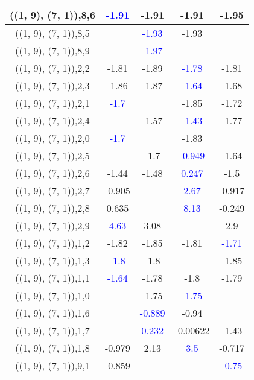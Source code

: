 \documentclass{article}
\begin{document}
\begin{center}
\begin{longtable}{|c|c|c|c|c|}
        	\hline
        	((1, 9), (7, 1)),8,6& \textcolor{blue}{-1.91}&-1.91&-1.91&-1.95\\
        	\hline
        	((1, 9), (7, 1)),8,5&& \textcolor{blue}{-1.93}&-1.93&\\
        	\hline
        	((1, 9), (7, 1)),8,9&& \textcolor{blue}{-1.97}&&\\
        	\hline
        	((1, 9), (7, 1)),2,2&-1.81&-1.89& \textcolor{blue}{-1.78}&-1.81\\
        	\hline
        	((1, 9), (7, 1)),2,3&-1.86&-1.87& \textcolor{blue}{-1.64}&-1.68\\
        	\hline
        	((1, 9), (7, 1)),2,1& \textcolor{blue}{-1.7}&&-1.85&-1.72\\
        	\hline
        	((1, 9), (7, 1)),2,4&&-1.57& \textcolor{blue}{-1.43}&-1.77\\
        	\hline
        	((1, 9), (7, 1)),2,0& \textcolor{blue}{-1.7}&&-1.83&\\
        	\hline
        	((1, 9), (7, 1)),2,5&&-1.7& \textcolor{blue}{-0.949}&-1.64\\
        	\hline
        	((1, 9), (7, 1)),2,6&-1.44&-1.48& \textcolor{blue}{0.247}&-1.5\\
        	\hline
        	((1, 9), (7, 1)),2,7&-0.905&& \textcolor{blue}{2.67}&-0.917\\
        	\hline
        	((1, 9), (7, 1)),2,8&0.635&& \textcolor{blue}{8.13}&-0.249\\
        	\hline
        	((1, 9), (7, 1)),2,9& \textcolor{blue}{4.63}&3.08&&2.9\\
        	\hline
        	((1, 9), (7, 1)),1,2&-1.82&-1.85&-1.81& \textcolor{blue}{-1.71}\\
        	\hline
        	((1, 9), (7, 1)),1,3& \textcolor{blue}{-1.8}&-1.8&&-1.85\\
        	\hline
        	((1, 9), (7, 1)),1,1& \textcolor{blue}{-1.64}&-1.78&-1.8&-1.79\\
        	\hline
        	((1, 9), (7, 1)),1,0&&-1.75& \textcolor{blue}{-1.75}&\\
        	\hline
        	((1, 9), (7, 1)),1,6&& \textcolor{blue}{-0.889}&-0.94&\\
        	\hline
        	((1, 9), (7, 1)),1,7&& \textcolor{blue}{0.232}&-0.00622&-1.43\\
        	\hline
        	((1, 9), (7, 1)),1,8&-0.979&2.13& \textcolor{blue}{3.5}&-0.717\\
        	\hline
        	((1, 9), (7, 1)),9,1&-0.859&&& \textcolor{blue}{-0.75}\\

\end{longtable}
\end{center}
\end{document}
